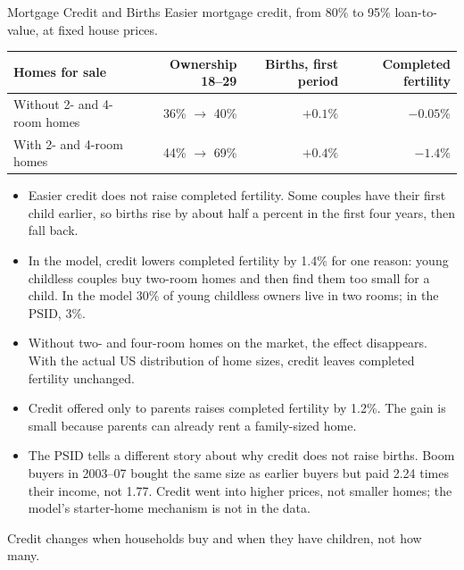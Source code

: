 \begin{frame}[t,label=credit-starter-homes]{Mortgage Credit and Births}
\scriptsize
Easier mortgage credit, from 80\% to 95\% loan-to-value, at fixed house prices.
\vspace{0pt}

{\centering
\renewcommand{\arraystretch}{1.05}\setlength{\tabcolsep}{7pt}
\begin{tabular}{@{}lrrr@{}}
\toprule
Homes for sale & Ownership 18--29 & Births, first period & Completed fertility \\
\midrule
Without 2- and 4-room homes & 36\% $\to$ 40\% & $+0.1\%$ & $-0.05\%$ \\
With 2- and 4-room homes & 44\% $\to$ 69\% & $+0.4\%$ & $-1.4\%$ \\
\bottomrule
\end{tabular}
\par}
\vspace{0pt}

\begin{itemize}\setlength\itemsep{0pt}
\item Easier credit does not raise completed fertility. Some couples have their first child earlier, so births rise by about half a percent in the first four years, then fall back.
\item In the model, credit lowers completed fertility by 1.4\% for one reason: young childless couples buy two-room homes and then find them too small for a child. In the model 30\% of young childless owners live in two rooms; in the PSID, 3\%.
\item Without two- and four-room homes on the market, the effect disappears. With the actual US distribution of home sizes, credit leaves completed fertility unchanged.
\item Credit offered only to parents raises completed fertility by 1.2\%. The gain is small because parents can already rent a family-sized home.
\item {\color{draftred}The PSID tells a different story about why credit does not raise births. Boom buyers in 2003--07 bought the same size as earlier buyers but paid 2.24 times their income, not 1.77. Credit went into higher prices, not smaller homes; the model's starter-home mechanism is not in the data.}
\end{itemize}
\vspace{0pt}
Credit changes when households buy and when they have children, not how many.
\end{frame}
